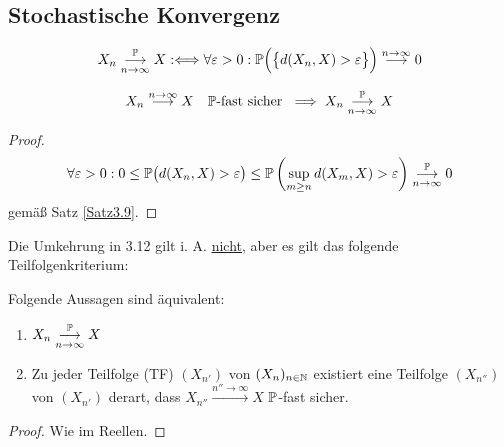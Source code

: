 \subsection*{Stochastische Konvergenz} %
\begin{definition} %
	\begin{align*}
		X_n
		\stackrelnew{n\to\infty}{\P}{\longrightarrow}
		X:\Longleftrightarrow\forall\varepsilon>0:
		\P\Big(\big\lbrace d(X_n,X)>\varepsilon\big\rbrace\Big)
		\stackrel{n\to\infty}{\longrightarrow}
		0
	\end{align*}
\end{definition}

\begin{satz}\label{Satz3.12}
	\begin{align*}
		X_n
		\stackrel{n\to\infty}{\longrightarrow}
		X\quad\P\text{-fast sicher }
		\implies X_n
		\stackrelnew{n\to\infty}{\P}{\longrightarrow}
		X
	\end{align*}
\end{satz}

\begin{proof}
	\begin{align*}
		\forall\varepsilon>0:
		0\leq\P\big(d(X_n,X)>\varepsilon\big)
		\leq\P\left(\sup\limits_{m\geq n}d(X_m,X)>\varepsilon\right)
		\stackrelnew{n\to\infty}{\P}{\longrightarrow}
		0
	\end{align*}
	gemäß Satz \ref{Satz3.9}.
\end{proof}

Die Umkehrung in 3.12 gilt i. A. \underline{nicht}, aber es gilt das folgende Teilfolgenkriterium:

\begin{satz}\label{satz3.13}\enter
	Folgende Aussagen sind äquivalent:
	\begin{enumerate}[label=(\arabic*)]
		\item $\begin{aligned}
			X_n
			\stackrelnew{n\to\infty}{\P}{\longrightarrow}
			X
		\end{aligned}$
		\item Zu jeder Teilfolge (TF) $(X_{n'})$ von $(X_n)_{n\in\N}$ existiert eine Teilfolge $(X_{n''})$ von $(X_{n'})$ derart, dass $X_{n''}
		\stackrel{n''\to\infty}{\longrightarrow} X$ $\P$-fast sicher.
	\end{enumerate}
\end{satz}

\begin{proof}
	Wie im Reellen.
\end{proof}

